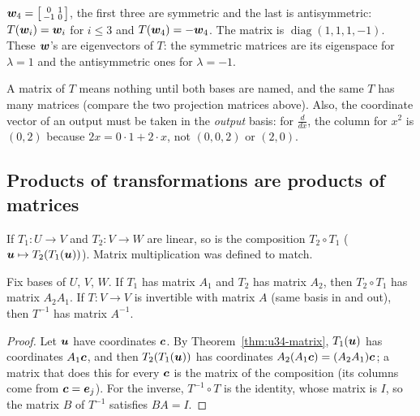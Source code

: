 \begin{example}
\begin{itemize}
        $\boldsymbol{w}_4=\left[\begin{smallmatrix}0&1\\-1&0\end{smallmatrix}\right]$, the first three are symmetric and the
        last is antisymmetric: $T(\boldsymbol{w}_i)=\boldsymbol{w}_i$ for $i\le3$ and $T(\boldsymbol{w}_4)=-\boldsymbol{w}_4$. The matrix is
        $\operatorname{diag}(1,1,1,-1)$. These $\boldsymbol{w}$'s are eigenvectors of $T$: the symmetric matrices
        are its eigenspace for $\lambda=1$ and the antisymmetric ones for $\lambda=-1$.
\end{itemize}
\end{example}

\begin{trap}
A matrix of $T$ means nothing until both bases are named, and the same $T$ has many matrices
(compare the two projection matrices above). Also, the coordinate vector of an output must be
taken in the \emph{output} basis: for $\frac{d}{dx}$, the column for $x^2$ is $(0,2)$ because
$2x=0\cdot1+2\cdot x$, not $(0,0,2)$ or $(2,0)$.
\end{trap}

\subsection{Products of transformations are products of matrices}

If $T_1\colon U\to V$ and $T_2\colon V\to W$ are linear, so is the composition $T_2\circ T_1$
($\boldsymbol{u}\mapsto T_2(T_1(\boldsymbol{u}))$). Matrix multiplication was defined to match.

\begin{proposition}\label{prop:u34-composition}
Fix bases of $U$, $V$, $W$. If $T_1$ has matrix $A_1$ and $T_2$ has matrix $A_2$, then
$T_2\circ T_1$ has matrix $A_2A_1$. If $T\colon V\to V$ is invertible with matrix $A$ (same basis in
and out), then $T^{-1}$ has matrix $A^{-1}$.
\end{proposition}
\begin{proof}
Let $\boldsymbol{u}$ have coordinates $\boldsymbol{c}$. By Theorem~\ref{thm:u34-matrix}, $T_1(\boldsymbol{u})$ has coordinates $A_1\boldsymbol{c}$,
and then $T_2(T_1(\boldsymbol{u}))$ has coordinates $A_2(A_1\boldsymbol{c})=(A_2A_1)\boldsymbol{c}$; a matrix that does this for every
$\boldsymbol{c}$ is the matrix of the composition (its columns come from $\boldsymbol{c}=\boldsymbol{e}_j$). For the inverse,
$T^{-1}\circ T$ is the identity, whose matrix is $I$, so the matrix $B$ of $T^{-1}$ satisfies $BA=I$.
\end{proof}

